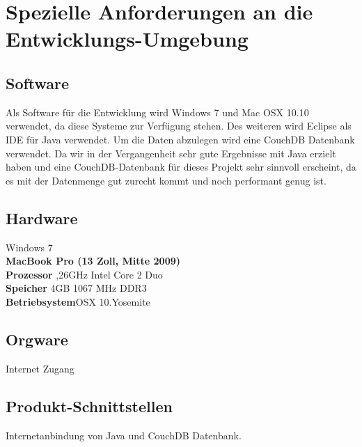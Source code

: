 \chapter{Spezielle Anforderungen an die Entwicklungs-Umgebung}
	
	\section{Software}
	Als Software für die Entwicklung wird Windows 7 und Mac OSX 10.10 verwendet, da diese Systeme zur Verfügung stehen. Des weiteren wird Eclipse als IDE für Java verwendet. Um die Daten abzulegen wird eine CouchDB Datenbank verwendet.
	Da wir in der Vergangenheit sehr gute Ergebnisse mit Java erzielt haben und eine CouchDB-Datenbank für dieses Projekt sehr sinnvoll erscheint, da es mit der Datenmenge gut zurecht kommt und noch performant genug ist.
	\section{Hardware}
	Windows 7\\
	
	\textbf{	MacBook Pro (13 Zoll, Mitte 2009)}\\
	\textbf{Prozessor} 	,26GHz Intel Core 2 Duo\\
	\textbf{Speicher} 	\quad 4GB 1067 MHz DDR3\\
	\textbf{Betriebsystem}\quad OSX 10.Yosemite

	
	\section{Orgware}
	Internet Zugang
	
	\section{Produkt-Schnittstellen}
	Internetanbindung von Java und CouchDB Datenbank.
